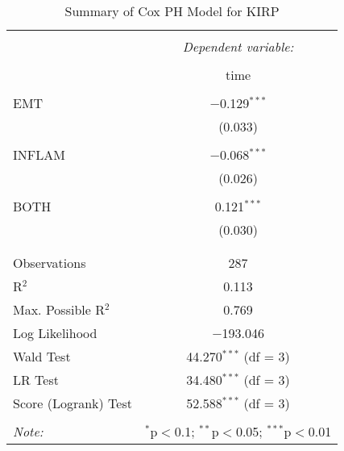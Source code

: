
\begin{table}[!htbp] \centering 
  \caption{Summary of Cox PH Model for KIRP} 
  \label{table:KIRP_cph} 
\begin{tabular}{@{\extracolsep{5pt}}lc} 
\\[-1.8ex]\hline 
\hline \\[-1.8ex] 
 & \multicolumn{1}{c}{\textit{Dependent variable:}} \\ 
\cline{2-2} 
\\[-1.8ex] & time \\ 
\hline \\[-1.8ex] 
 EMT & $-$0.129$^{***}$ \\ 
  & (0.033) \\ 
  & \\ 
 INFLAM & $-$0.068$^{***}$ \\ 
  & (0.026) \\ 
  & \\ 
 BOTH & 0.121$^{***}$ \\ 
  & (0.030) \\ 
  & \\ 
\hline \\[-1.8ex] 
Observations & 287 \\ 
R$^{2}$ & 0.113 \\ 
Max. Possible R$^{2}$ & 0.769 \\ 
Log Likelihood & $-$193.046 \\ 
Wald Test & 44.270$^{***}$ (df = 3) \\ 
LR Test & 34.480$^{***}$ (df = 3) \\ 
Score (Logrank) Test & 52.588$^{***}$ (df = 3) \\ 
\hline 
\hline \\[-1.8ex] 
\textit{Note:}  & \multicolumn{1}{r}{$^{*}$p$<$0.1; $^{**}$p$<$0.05; $^{***}$p$<$0.01} \\ 
\end{tabular} 
\end{table} 
